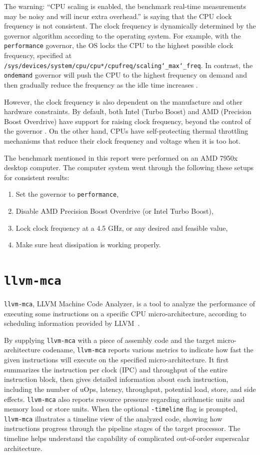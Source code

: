 \documentclass[logo,bsc,singlespacing,parskip]{infthesis}
\newcommand{\mca}{\texttt{llvm-mca}}
\newenvironment{compactlist}
{ \begin{enumerate}
    \setlength{\itemsep}{0pt}
    \setlength{\parskip}{0pt}
    \setlength{\parsep}{0pt}     
}
{ \end{enumerate} }
\begin{document}
The warning: ``CPU scaling is enabled, the benchmark real-time measurements may
be noisy and will incur extra overhead.'' is saying that the CPU clock frequency
is not consistent. The clock frequency is dynamically determined by the governor
algorithm according to the operating system. For example, with the
\texttt{performance} governor, the OS locks the CPU to the highest possible
clock frequency, specified at
\texttt{/sys/devices/system/cpu/cpu*/cpufreq/scaling\char`_max\char`_freq}. In
contrast, the \texttt{ondemand} governor will push the CPU to the highest
frequency on demand and then gradually reduce the frequency as the idle time
increases \cite{archLinuxFreqScal}.

However, the clock frequency is also dependent on the manufacture and other hardware constraints.
By default, both Intel (Turbo Boost) and AMD (Precision Boost Overdrive) have
support for raising clock frequency, beyond the control of the governor
\cite{GoogleBenchReduceVariance}. On the other hand, CPUs have self-protecting
thermal throttling mechanisms that reduce their clock frequency and voltage when
it is too hot. 

The benchmark mentioned in this report were performed on an AMD 7950x desktop
computer. The computer system went through the following these setups for
consistent results:
\begin{compactlist}
    \item Set the governor to \texttt{performance}, 
    \item Disable AMD Precision Boost Overdrive (or Intel Turbo Boost), 
    \item Lock clock frequency at a 4.5 GHz, or any desired and feasible value,
    \item Make sure heat dissipation is working properly.
\end{compactlist}



\section{\mca{}}

\mca{}, LLVM Machine Code Analyzer, is a tool to analyze the performance of
executing some instructions on a specific CPU micro-architecture, according to
scheduling information provided by LLVM~\cite{llvm-mca}. 

By supplying \mca{} with a piece of assembly code and the target
micro-architecture codename, \mca{} reports various metrics to indicate how fast
the given instructions will execute on the specified micro-architecture. It
first summarizes the instruction per clock (IPC) and throughput of the entire
instruction block, then gives detailed information about each instruction,
including the number of uOps, latency, throughput, potential load, store, and side
effects. \mca{} also reports resource pressure regarding arithmetic units and
memory load or store units. When the optional \texttt{-timeline} flag is
prompted, \mca{} illustrates a timeline view of the analyzed code, showing how
instructions progress through the pipeline stages of the target processor. The
timeline helps understand the capability of complicated out-of-order superscalar
architecture. 
\end{document}
